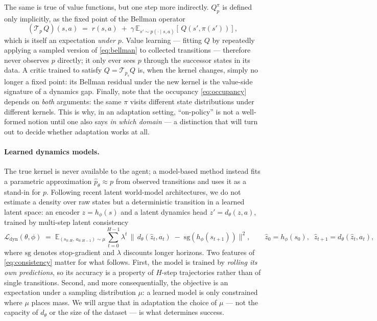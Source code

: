 The same is true of value functions, but one step more indirectly. $Q^{\pi}_{p}$
is defined only implicitly, as the fixed point of the Bellman operator
\begin{equation}
\left(\mathcal{T}_{p}\,Q\right)(s,a) \;=\; r(s,a) \;+\;
\gamma\, \mathbb{E}_{s' \sim p(\cdot \mid s,a)}\!\left[\,Q\!\left(s', \pi(s')\right)\right],
\label{eq:bellman}
\end{equation}
which is itself an expectation \emph{under $p$}. Value learning --- fitting
$Q$ by repeatedly applying a sampled version of \eqref{eq:bellman} to collected
transitions --- therefore never observes $p$ directly; it only ever sees $p$
through the successor states in its data. A critic trained to satisfy
$Q = \mathcal{T}_{p_s} Q$ is, when the kernel changes, simply no longer a fixed
point: its Bellman residual under the new kernel is the value-side signature of
a dynamics gap. Finally, note that the occupancy \eqref{eq:occupancy} depends on
\emph{both} arguments: the same $\pi$ visits different state distributions under
different kernels. This is why, in an adaptation setting, ``on-policy'' is not a
well-formed notion until one also says \emph{in which domain} --- a distinction
that will turn out to decide whether adaptation works at all.

\paragraph{Learned dynamics models.}
The true kernel is never available to the agent; a model-based method instead
fits a parametric approximation $\hat{p}_\theta \approx p$ from observed
transitions and uses it as a stand-in for $p$. Following recent latent
world-model architectures, we do not estimate a density over raw states but a
deterministic transition in a learned latent space: an encoder
$z = h_\phi(s)$ and a latent dynamics head $z' = d_\theta(z,a)$, trained by
multi-step latent consistency
\begin{equation}
\mathcal{L}_{\mathrm{dyn}}(\theta,\phi) \;=\;
\mathbb{E}_{(s_{0:H},\,a_{0:H-1}) \sim \mu}
\sum_{t=0}^{H-1} \lambda^{t}\,
\big\|\, d_\theta(\hat{z}_t, a_t) \;-\; \mathrm{sg}\!\left(h_\phi(s_{t+1})\right)
\big\|^{2},
\qquad \hat{z}_0 = h_\phi(s_0),\;\; \hat{z}_{t+1} = d_\theta(\hat{z}_t,a_t),
\label{eq:consistency}
\end{equation}
where $\mathrm{sg}$ denotes stop-gradient and $\lambda$ discounts longer
horizons. Two features of \eqref{eq:consistency} matter for what follows.
First, the model is trained by \emph{rolling its own predictions}, so its
accuracy is a property of $H$-step trajectories rather than of single
transitions. Second, and more consequentially, the objective is an expectation
under a sampling distribution $\mu$: a learned model is only constrained where
$\mu$ places mass. We will argue that in adaptation the choice of $\mu$ --- not
the capacity of $d_\theta$ or the size of the dataset --- is what determines
success.

